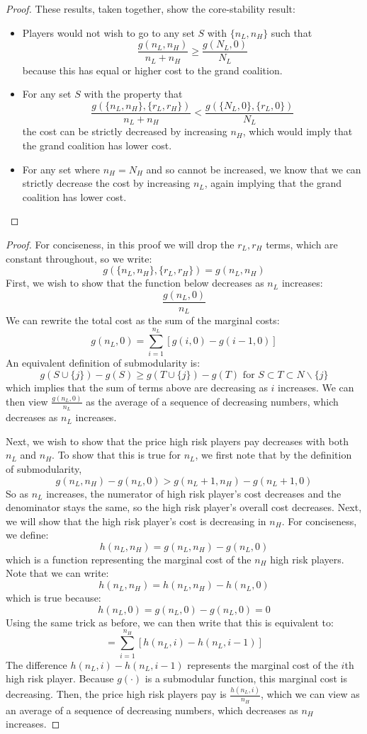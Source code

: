 \documentclass[sigconf]{acmart}
\newcommand{\br}[1]{\left[ #1 \right]}
\newcommand{\NL}[0]{\ensuremath{N_L}}
\newcommand{\NH}[0]{\ensuremath{N_H}}
\newcommand{\nL}[0]{\ensuremath{n_L}}
\newcommand{\nH}[0]{\ensuremath{n_H}}
\newcommand{\rL}[0]{\ensuremath{r_L}}
\newcommand{\rH}[0]{\ensuremath{r_H}}
\newcommand{\cost}[0]{\ensuremath{g}}
\newcommand{\cd}[0]{\cdot}
\begin{document}
\begin{proof}
These results, taken together, show the core-stability result: 
\begin{itemize}
    \item Players would not wish to go to any set $S$ with $\{\nL, \nH\}$ such that 
    $$\frac{\cost(\nL,\nH)}{\nL + \nH} \geq \frac{\cost(\NL,0)}{\NL}$$
    because this has equal or higher cost to the grand coalition. 
    \item For any set $S$ with the property that 
      $$\frac{\cost(\{\nL,\nH \}, \{\rL, \rH\})}{\nL + \nH} < \frac{\cost(\{\NL,0 \}, \{\rL,0\})}{\NL }$$
      the cost can be strictly decreased by increasing $\nH$, which would imply that the grand coalition has lower cost. 
    \item For any set where $\nH = \NH$ and so cannot be increased, we know that we can strictly decrease the cost by increasing $\nL$, again implying that the grand coalition has lower cost. 
\end{itemize}

\end{proof}


\maxsubpref*

\begin{proof}
For conciseness, in this proof we will drop the $\rL, \rH$ terms, which are constant throughout, so we write: 
$$\cost(\{\nL, \nH\}, \{\rL, \rH\}) = \cost(\nL, \nH)$$
First, we wish to show that the function below decreases as $\nL$ increases: 
$$ \frac{\cost(\nL,0)}{\nL}$$
We can rewrite the total cost as the sum of the marginal costs: 
$$\cost(\nL,0) = \sum_{i=1}^{\nL}\br{\cost(i,0) - \cost(i-1,0)}$$
An equivalent definition of submodularity is: 
$$\cost(S \cup \{j\}) - \cost(S) \geq \cost(T \cup \{j\}) - \cost(T) \text{ for } S \subset T \subset N\backslash \{j\}$$
which implies that the sum of terms above are decreasing as $i$ increases. We can then view $\frac{\cost(\nL,0)}{\nL}$ as the average of a sequence of decreasing numbers, which decreases as $\nL$ increases. 

Next, we wish to show that the price high risk players pay decreases with both $\nL$ and $\nH$. To show that this is true for $\nL$, we first note that by the definition of submodularity, 
$$\cost(\nL,\nH) - \cost(\nL,0) > \cost(\nL+1,\nH) - \cost(\nL+1,0)$$
So as $\nL$ increases, the numerator of high risk player's cost decreases and the denominator stays the same, so the high risk player's overall cost decreases. 
Next, we will show that the high risk player's cost is decreasing in $\nH$. For conciseness, we define: 
$$h(\nL,\nH) = \cost(\nL,\nH) - \cost(\nL,0)$$
which is a function representing the marginal cost of the $\nH$ high risk players. Note that we can write:
$$h(\nL,\nH) =h(\nL,\nH) - h(\nL,0) $$
which is true because: 
$$h(\nL,0) = \cost(\nL,0) - \cost(\nL,0 )=0$$
Using the same trick as before, we can then write that this is equivalent to: 
$$= \sum_{i=1}^{\nH}\br{h(\nL,i) - h(\nL,i-1)}$$
The difference $h(\nL,i) - h(\nL,i-1)$ represents the marginal cost of the $i$th high risk player. Because $\cost(\cd)$ is a submodular function, this marginal cost is decreasing. Then, the price high risk players pay is $\frac{h(\nL,i)}{\nH}$, which we can view as an average of a sequence of decreasing numbers, which decreases as $\nH$ increases. 
\end{proof}
\end{document}
